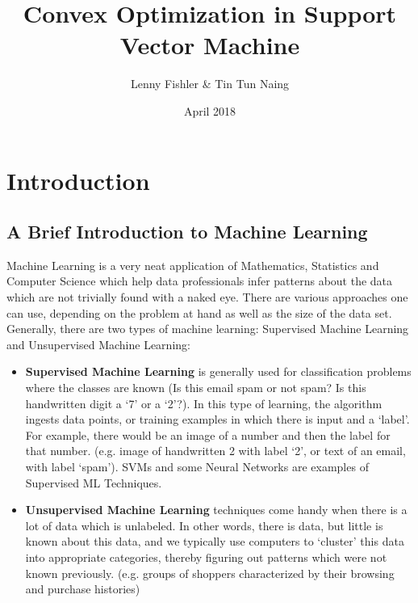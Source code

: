 \documentclass[11pt, a4paper]{article}
\title{Convex Optimization in Support Vector Machine}
\author{Lenny Fishler \& Tin Tun Naing}
\date{April 2018}
\begin{document}
\newcommand*{\QEDA}{\hfill\text{QED}}%
\newcommand*{\QEDB}{\hfill\ensuremath{\square}}%
\newcommand\tab[1][1cm]{\hspace*{#1}}
\maketitle


\section{Introduction}
\subsection{A Brief Introduction to Machine Learning}
Machine Learning is a very neat application of Mathematics, Statistics and Computer Science which help data professionals infer patterns about the data which are not trivially found with a naked eye.
There are various approaches one can use, depending on the problem at hand as well as the size of the data set. Generally, there are two types of machine learning: Supervised Machine Learning and Unsupervised Machine Learning:
\begin{itemize}
\item \textbf{Supervised Machine Learning} is generally used for classification problems where the classes are known (Is this email spam or not spam? Is this handwritten digit a `7' or a `2'?). In this type of learning, the algorithm ingests data points, or training examples in which there is input and a `label'. For example, there would be an image of a number and then the label for that number. (e.g. image of handwritten 2 with label `2', or text of an email, with label `spam'). SVMs and some Neural Networks are examples of Supervised ML Techniques.
\item \textbf{Unsupervised Machine Learning} techniques come handy when there is a lot of data which is unlabeled. In other words, there is data, but little is known about this data, and we typically use computers to `cluster' this data into appropriate categories, thereby figuring out patterns which were not known previously. (e.g. groups of shoppers characterized by their browsing and purchase histories)
\end{itemize}
\end{document}
